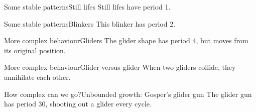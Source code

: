 \begin{frame}{Some stable patterns}{Still lifes}
	Still lifes have period 1.
\end{frame}

\begin{frame}{Some stable patterns}{Blinkers}
	This blinker has period 2.
\end{frame}

\begin{frame}{More complex behaviour}{Gliders}
	The glider shape has period 4, but moves from its original position.
\end{frame}

\begin{frame}{More complex behaviour}{Glider versus glider}
	When two gliders collide, they annihilate each other.
\end{frame}

\begin{frame}{How complex can we go?}{Unbounded growth: Gosper's glider gun}
	The glider gun has period 30, shooting out a glider every cycle.

\end{frame}

